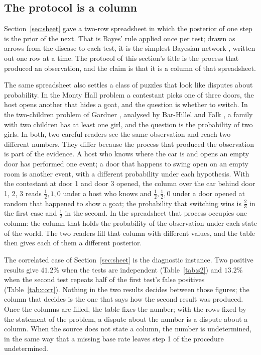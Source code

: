 \documentclass[11pt]{article}
\begin{document}
\subsection{The protocol is a column}

Section~\ref{sec:sheet} gave a two-row spreadsheet in which the posterior of one step is the prior of the next. That is Bayes' rule applied once per test; drawn as arrows from the disease to each test, it is the simplest Bayesian network \cite{pearl1988}, written out one row at a time. The protocol of this section's title is the process that produced an observation, and the claim is that it is a column of that spreadsheet.

The same spreadsheet also settles a class of puzzles that look like disputes about probability. In the Monty Hall problem a contestant picks one of three doors, the host opens another that hides a goat, and the question is whether to switch. In the two-children problem of Gardner \cite{gardner1959}, analysed by Bar-Hillel and Falk \cite{barhillel1982}, a family with two children has at least one girl, and the question is the probability of two girls. In both, two careful readers see the same observation and reach two different numbers. They differ because the process that produced the observation is part of the evidence. A host who knows where the car is and opens an empty door has performed one event; a door that happens to swing open on an empty room is another event, with a different probability under each hypothesis. With the contestant at door 1 and door 3 opened, the column over the car behind door 1, 2, 3 reads $\tfrac{1}{2}, 1, 0$ under a host who knows and $\tfrac{1}{2}, \tfrac{1}{2}, 0$ under a door opened at random that happened to show a goat; the probability that switching wins is $\tfrac{2}{3}$ in the first case and $\tfrac{1}{2}$ in the second. In the spreadsheet that process occupies one column: the column that holds the probability of the observation under each state of the world. The two readers fill that column with different values, and the table then gives each of them a different posterior.

The correlated case of Section~\ref{sec:sheet} is the diagnostic instance. Two positive results give $41.2\%$ when the tests are independent (Table~\ref{tab:s2}) and $13.2\%$ when the second test repeats half of the first test's false positives (Table~\ref{tab:corr}). Nothing in the two results decides between those figures; the column that decides is the one that says how the second result was produced. Once the columns are filled, the table fixes the number; with the rows fixed by the statement of the problem, a dispute about the number is a dispute about a column. When the source does not state a column, the number is undetermined, in the same way that a missing base rate leaves step 1 of the procedure undetermined.
\end{document}

